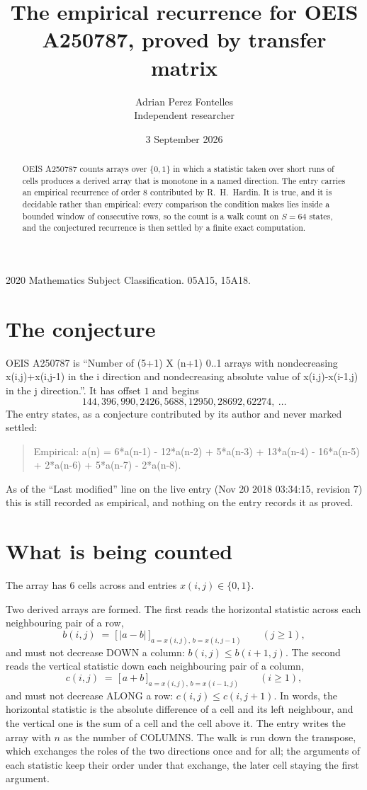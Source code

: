 \documentclass[11pt,a4paper]{article}
\title{The empirical recurrence for OEIS A250787, proved by transfer matrix}
\author{Adrian Perez Fontelles\\ \small Independent researcher}
\date{3 September 2026}
\theoremstyle{plain}
\theoremstyle{definition}
\begin{document}
\maketitle

\begin{abstract}
OEIS A250787 counts arrays over $\{0,1\}$ in which a statistic taken over short runs
of cells produces a derived array that is monotone in a named direction. The entry carries an
empirical recurrence of order $8$ contributed by R.~H.~Hardin. It is true, and it is
decidable rather than empirical: every comparison the condition makes lies inside a bounded
window of consecutive rows, so the count is a walk count on $S=64$ states, and the
conjectured recurrence is then settled by a finite exact computation.
\end{abstract}

\noindent\small 2020 Mathematics Subject Classification. 05A15, 15A18.\normalsize

\section{The conjecture}

OEIS A250787 is ``Number of (5+1) X (n+1) 0..1 arrays with nondecreasing x(i,j)+x(i,j-1) in the i direction and nondecreasing absolute value of x(i,j)-x(i-1,j) in the j direction.''. It has offset $1$ and begins
\[
144, 396, 990, 2426, 5688, 12950, 28692, 62274,\ \dots
\]
The entry states, as a conjecture contributed by its author and never marked settled:
\begin{quote}
Empirical: a(n) = 6*a(n-1) - 12*a(n-2) + 5*a(n-3) + 13*a(n-4) - 16*a(n-5) + 2*a(n-6) + 5*a(n-7) - 2*a(n-8).
\end{quote}
As of the ``Last modified'' line on the live entry (Nov 20 2018 03:34:15, revision 7) this is still
recorded as empirical, and nothing on the entry records it as proved.

\section{What is being counted}

The array has $6$ cells across and entries $x(i,j)\in\{0,1\}$.

Two derived arrays are formed. The first reads the horizontal statistic across each
neighbouring pair of a row,
\[
b(i,j)\;=\;\bigl[\,\lvert a-b\rvert\,\bigr]_{a=x(i,j),\,b=x(i,j-1)}\qquad (j\ge1),
\]
and must not decrease DOWN a column: $b(i,j)\le b(i{+}1,j)$. The second reads the vertical
statistic down each neighbouring pair of a column,
\[
c(i,j)\;=\;\bigl[\,a+b\,\bigr]_{a=x(i,j),\,b=x(i{-}1,j)}\qquad (i\ge1),
\]
and must not decrease ALONG a row: $c(i,j)\le c(i,j{+}1)$. In words, the horizontal statistic
is the absolute difference of a cell and its left neighbour, and the vertical one is
the sum of a cell and the cell above it. The entry writes the array with $n$ as the number of COLUMNS. The walk is run down the transpose, which exchanges the roles of the two directions once and for all; the arguments of each statistic keep their order under that exchange, the later cell staying the first argument.
\end{document}
